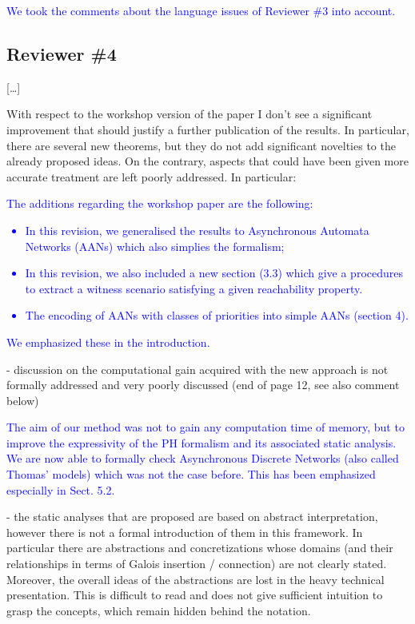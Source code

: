 \documentclass[11pt]{article}
\newcommand{\answer}[1]{\textcolor{blue}{#1}\vspace*{1em}}
\begin{document}
\answer{
We took the comments about the language issues of Reviewer \#3 into account.
}



\subsection*{Reviewer \#4}

[…]

With respect to the workshop version of the paper I don't see a significant improvement that should justify a further publication of the results. In particular, there are several new theorems, but they do not add significant novelties to the already proposed ideas. On the contrary, aspects that could have been given more accurate treatment are left poorly addressed. In particular:

\answer{
The additions regarding the workshop paper are the following:
\begin{itemize}
  \item In this revision, we generalised the results to Asynchronous Automata
  Networks (AANs) which also simplies the formalism;
  \item In this revision, we also included a new section (3.3) which give a
  procedures to extract a witness scenario satisfying a given reachability
  property.
  \item The encoding of AANs with classes of priorities into simple AANs
  (section 4).
\end{itemize}
We emphasized these in the introduction.
}

- discussion on the computational gain acquired with the new approach is not formally addressed and very poorly discussed (end of page 12, see also comment below)

\answer{
The aim of our method was not to gain any computation time of memory,
but to improve the expressivity of the PH formalism and its associated static analysis.
We are now able to formally check Asynchronous Discrete Networks
(also called Thomas' models)
which was not the case before.
This has been emphasized especially in Sect. 5.2.
}

- the static analyses that are proposed are based on abstract interpretation, however there is not a formal introduction of them in this framework. In particular there are abstractions and concretizations whose domains (and their relationships in terms of Galois insertion / connection) are not clearly stated. Moreover, the overall ideas of the abstractions are lost in the heavy technical presentation. This is difficult to read and does not give sufficient intuition to grasp the concepts, which remain hidden behind the notation. 
\end{document}

